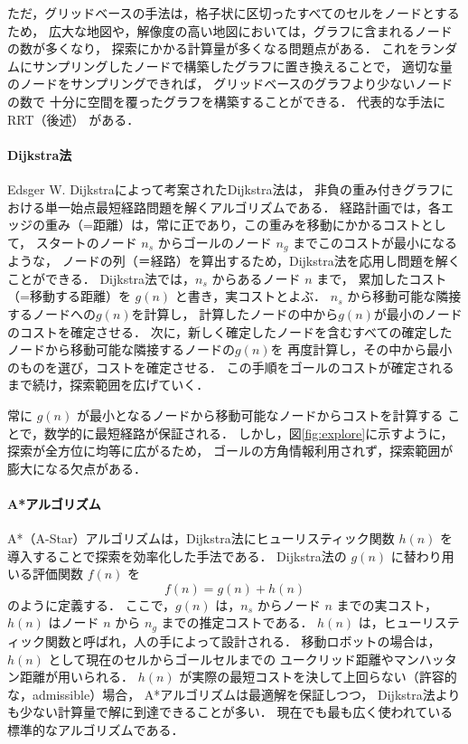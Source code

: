 ただ，グリッドベースの手法は，格子状に区切ったすべてのセルをノードとするため，
広大な地図や，解像度の高い地図においては，グラフに含まれるノードの数が多くなり，
探索にかかる計算量が多くなる問題点がある．
これをランダムにサンプリングしたノードで構築したグラフに置き換えることで，
適切な量のノードをサンプリングできれば，
グリッドベースのグラフより少ないノードの数で
十分に空間を覆ったグラフを構築することができる．
代表的な手法にRRT（後述）%
がある．

\paragraph{Dijkstra法}
Edsger W. Dijkstraによって考案されたDijkstra法は，
非負の重み付きグラフにおける単一始点最短経路問題を解くアルゴリズムである\cite{Dijkstra1959}．
経路計画では，各エッジの重み（=距離）は，常に正であり，この重みを移動にかかるコストとして，
スタートのノード $n_s$ からゴールのノード $n_g$ までこのコストが最小になるような，
ノードの列（＝経路）を算出するため，Dijkstra法を応用し問題を解くことができる．
Dijkstra法では，$n_s$ からあるノード $n$ まで，
累加したコスト（=移動する距離）を $g(n)$ と書き，実コストとよぶ．
$n_s$ から移動可能な隣接するノードへの$g(n)$を計算し，
計算したノードの中から$g(n)$が最小のノードのコストを確定させる．
次に，新しく確定したノードを含むすべての確定したノードから移動可能な隣接するノードの$g(n)$を
再度計算し，その中から最小のものを選び，コストを確定させる．
この手順をゴールのコストが確定されるまで続け，探索範囲を広げていく．

常に $g(n)$ が最小となるノードから移動可能なノードからコストを計算する
ことで，数学的に最短経路が保証される．
しかし，図\ref{fig:explore}に示すように，探索が全方位に均等に広がるため，
ゴールの方角情報利用されず，探索範囲が膨大になる欠点がある．

\paragraph{A*アルゴリズム}
A*（A-Star）アルゴリズムは，Dijkstra法にヒューリスティック関数 $h(n)$ 
を導入することで探索を効率化した手法である．\cite{Hart1968}
Dijkstra法の $g(n)$ に替わり用いる評価関数 $f(n)$ を
\begin{equation}
    f(n) = g(n) + h(n)
\end{equation}
のように定義する．
ここで，$g(n)$ は，$n_s$ からノード $n$ までの実コスト，
$h(n)$ はノード $n$ から $n_g$ までの推定コストである．
$h(n)$ は，ヒューリスティック関数と呼ばれ，人の手によって設計される．
移動ロボットの場合は，$h(n)$ として現在のセルからゴールセルまでの
ユークリッド距離やマンハッタン距離が用いられる．
$h(n)$ が実際の最短コストを決して上回らない（許容的な，admissible）場合，
A*アルゴリズムは最適解を保証しつつ，
Dijkstra法よりも少ない計算量で解に到達できることが多い．
現在でも最も広く使われている標準的なアルゴリズムである．

